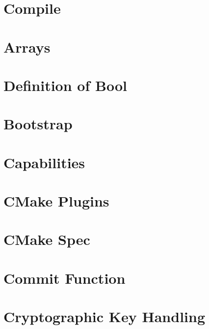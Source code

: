 \let\mypdfximage\pdfximage\def\pdfximage{\immediate\mypdfximage}\documentclass[twoside]{book}
\newcommand{\+}{\discretionary{\mbox{\scriptsize$\hookleftarrow$}}{}{}}
\begin{document}
\chapter{Compile}
\label{doc_COMPILE_md}

\chapter{Arrays}
\label{doc_decisions_array_md}

\chapter{Definition of Bool}
\label{doc_decisions_boolean_md}

\chapter{Bootstrap}
\label{doc_decisions_bootstrap_md}

\chapter{Capabilities}
\label{doc_decisions_capabilities_md}

\chapter{C\+Make Plugins}
\label{doc_decisions_cmake_plugins_md}

\chapter{C\+Make Spec}
\label{doc_decisions_cmake_spec_md}

\chapter{Commit Function}
\label{doc_decisions_commit_function_md}

\chapter{Cryptographic Key Handling}
\label{doc_decisions_cryptograhic_key_handling_md}

\end{document}
